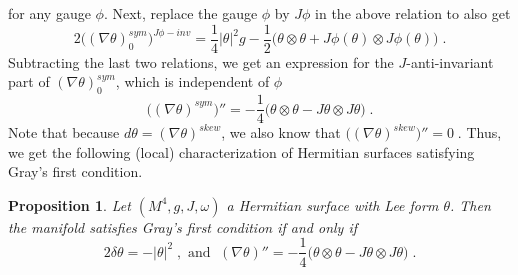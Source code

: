 \documentclass{amsart}
\newtheorem{prop}[theorem]{Proposition}
\begin{document}
for any gauge $\phi$. Next, replace the gauge $\phi$ by $J\phi$ in the above relation to also get
\begin{equation} \label{H1Jphi-inv} \nonumber
2\big( (\nabla \theta)_0^{sym} \big)^{J\phi-inv} = \frac{1}{4} |\theta|^2 g - \frac{1}{2} \big( \theta \otimes \theta + J\phi(\theta) \otimes J\phi(\theta) \big) \; .
\end{equation}
Subtracting the last two relations, we get an expression for the $J$-anti-invariant part of $(\nabla \theta)_0^{sym}$, which is independent of $\phi$
\begin{equation} \label{H1J-anti}
\big( (\nabla \theta)^{sym} \big) '' = - \frac{1}{4} \big( \theta \otimes \theta - J\theta \otimes J \theta \big) \; .
\end{equation}
Note that because $d\theta = (\nabla \theta )^{skew}$, we also know that 
$ \big( (\nabla \theta)^{skew} \big) '' = 0 \; .$
Thus, we get the following (local) characterization of Hermitian surfaces satisfying Gray's first condition.
\begin{prop} \label{H1-loc-theta}
Let $(M^4, g, J, \omega)$ a Hermitian surface with Lee form $\theta$. Then the manifold satisfies Gray's first condition if and only if
\begin{equation} \label{H1-loc-2cond}
   2\delta \theta = - |\theta|^2 \; ,  \mbox{ and } \; (\nabla \theta)'' = - \frac{1}{4} \big( \theta \otimes \theta - J\theta \otimes J \theta \big) \; . 
\end{equation}  
\end{prop}
\end{document}
